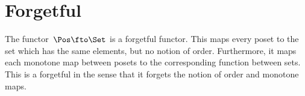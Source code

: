 \section{Forgetful }


\begin{example}
    The functor~$\Pos \fto \Set$ is a forgetful functor.
    This  maps every poset to the set which has the same elements, but no notion of order.
    Furthermore, it maps each monotone map between posets to the corresponding function between sets.
    This is a forgetful  in the sense that it forgets the notion of order and monotone maps.
\end{example}
